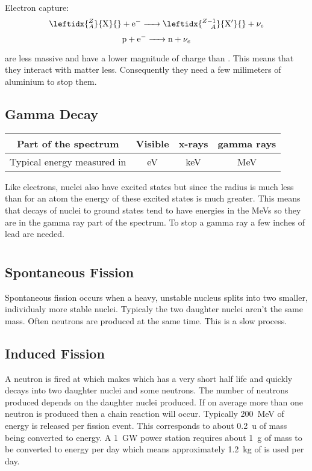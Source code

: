 Electron capture:
\[\leftidx{^Z_A}{\mathrm{X}}{}+\electron\ce{->}\leftidx{^{Z-1}_{\hphantom{{}-1}A}}{\mathrm{X}'}{}+\neutrino[e]\]
\[\proton+\electron\ce{->}\neutron+\neutrino[e]\]

\bparticles are less massive and have a lower magnitude of charge than \aparticles. This means that they interact with matter less. Consequently they need a few milimeters of aluminium to stop them.

\subsection*{Gamma Decay}

\begin{center}
\begin{tabular}{c|ccc}
Part of the spectrum & Visible & x-rays & gamma rays\\\hline
Typical energy measured in & \si{eV}& \si{keV} & \si{MeV}
\end{tabular}
\end{center}

Like electrons, nuclei also have excited states but since the radius is much less than for an atom the energy of these excited states is much greater. This means that decays of nuclei to ground states tend to have energies in the \si{MeV}s so they are in the gamma ray part of the spectrum. To stop a gamma ray a few inches of lead are needed.

\section{}

\subsection*{Spontaneous Fission}

Spontaneous fission occurs when a heavy, unstable nucleus splits into two smaller, individualy more stable nuclei. Typicaly the two daughter nuclei aren't the same mass. Often neutrons are produced at the same time. This is a slow process.

\subsection*{Induced Fission}

A neutron is fired at  which makes  which has a very short half life and quickly decays into two daughter nuclei and some neutrons. The number of neutrons produced depends on the daughter nuclei produced. If on average more than one neutron is produced then a chain reaction will occur. Typically \SI{200}{MeV} of energy is released per fission event. This corresponds to about \SI{0.2}{u} of mass being converted to energy. A \SI{1}{GW} power station requires about \SI{1}{g} of mass to be converted to energy per day which means approximately \SI{1.2}{kg} of  is used per day.

